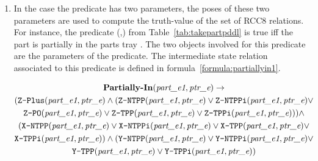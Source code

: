 \begin{enumerate}
\item In the case the predicate has two parameters, the poses of these two parameters are used to compute the truth-value of the set of RCC8 relations. For instance, the predicate (,) from Table~\ref{tab:takepartpddl} is true iff the part  is partially in the parts tray . The two objects involved for this predicate are the parameters of the predicate. The intermediate state relation associated to this predicate is defined in formula~\ref{formula:partiallyin1}.


\begin{gather}
\label{formula:partiallyin1}
\textbf{Partially-In}(\textit{part\_e1}, \textit{ptr\_e}) \rightarrow   \\
(\texttt{Z-Plus}(\textit{part\_e1}, \textit{ptr\_e}) \wedge (\texttt{Z-NTPP}(\textit{part\_e1}, \textit{ptr\_e}) \vee \texttt{Z-NTPPi}(\textit{part\_e1}, \textit{ptr\_e}) \vee  \notag\\\texttt{Z-PO}(\textit{part\_e1}, \textit{ptr\_e}) \vee \texttt{Z-TPP}(\textit{part\_e1}, \textit{ptr\_e}) \vee \texttt{Z-TPPi}(\textit{part\_e1}, \textit{ptr\_e}))) \wedge \notag\\
(\texttt{X-NTPP}(\textit{part\_e1}, \textit{ptr\_e}) \vee \texttt{X-NTPPi}(\textit{part\_e1}, \textit{ptr\_e}) \vee \texttt{X-TPP}(\textit{part\_e1}, \textit{ptr\_e}) \vee  \notag\\ \texttt{X-TPPi}(\textit{part\_e1}, \textit{ptr\_e}))\wedge
(\texttt{Y-NTPP}(\textit{part\_e1}, \textit{ptr\_e}) \vee \texttt{Y-NTPPi}(\textit{part\_e1}, \textit{ptr\_e}) \vee  \notag\\ \texttt{Y-TPP}(\textit{part\_e1}, \textit{ptr\_e}) \vee \texttt{Y-TPPi}(\textit{part\_e1}, \textit{ptr\_e})) \notag
\end{gather}


\end{enumerate}
